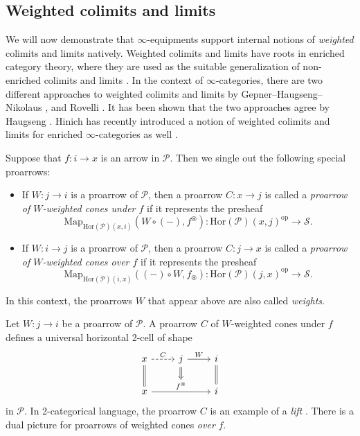 \documentclass[a4paper, 11pt]{amsart}
\numberwithin{theorem}{section}
\theoremstyle{definition}
\newcommand{\op}{\mathrm{op}}
\newcommand{\map}{\mathrm{Map}}
\renewcommand{\S}{\mathscr{S}}
\renewcommand{\P}{\mathscr{P}}
\newcommand{\Hor}{\mathrm{Hor}}
\begin{document}
\subsection{Weighted colimits and limits}\label{ssection.weighted-colims} We will now demonstrate 
that $\infty$-equipments support internal notions of \textit{weighted} colimits and limits natively.
Weighted colimits and limits have roots in enriched category theory, where they are used as the suitable generalization of non-enriched colimits and limits \cite{BorceuxKelly}. 
In the context of $\infty$-categories, there are two 
different approaches to weighted colimits and limits by Gepner--Haugseng--Nikolaus \cite{GepnerHaugsengNikolaus}, and Rovelli \cite{Rovelli}. It has been 
shown that the two approaches agree by Haugseng  \cite[Corollary 4.5]{HaugsengEnds}. Hinich has recently introduced a notion of weighted colimits and limits for enriched $\infty$-categories as well \cite{Hinich}. 

\begin{definition}\label{def.proarrow-cones}
Suppose that $f : i \rightarrow x$ is an arrow in $\P$. Then we single out the following special proarrows:
\begin{itemize}[noitemsep]
	\item If $W : j \rightarrow i$ is a proarrow of $\P$, then a proarrow $C : x \rightarrow j$ is called a \textit{proarrow of $W$-weighted cones under $f$} 
	if it represents the presheaf 
$$
\map_{\Hor(\P)(x,i)}(W \circ (-), f^\circledast) : \Hor(\P)(x,j)^\op \rightarrow \S.
$$
	\item If $W : i \rightarrow j$ is a proarrow of $\P$, then a proarrow $C : j \rightarrow x$ is called a \textit{proarrow of $W$-weighted cones over $f$} if it represents the presheaf 
$$
\map_{\Hor(\P)(i,x)}((-) \circ W, f_\circledast) : \Hor(\P)(j, x)^\op \rightarrow \S.
$$
\end{itemize}
In this context, the proarrows $W$ that appear above are also called \textit{weights}.
\end{definition}

\begin{remark}\label{rem.proarrow-cones}
	Let $W : j \to i$ be a proarrow of $\P$. A proarrow $C$ of $W$-weighted cones under $f$ defines a universal horizontal 2-cell of shape
	\[ 
		\begin{tikzcd}
			x \arrow[d,equal] \arrow[r, dashed, "C"] & |[alias=f]| j \arrow[r, "W"] & i \arrow[d,equal] \\
			x \arrow[rr, "f^\circledast"name=t] && i
			\arrow[from=f,to=t,Rightarrow]
		\end{tikzcd}
	\]
	in $\P$. In 2-categorical language, the proarrow $C$ is an example of a \textit{lift} \cite[Section 1]{StreetWalters}. There is a dual picture for proarrows of weighted cones \textit{over} $f$.
\end{remark}
\end{document}
